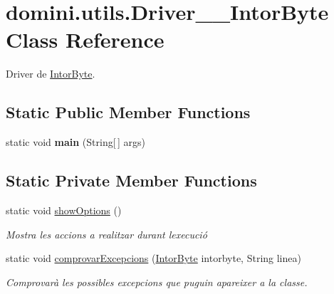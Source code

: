 \hypertarget{classdomini_1_1utils_1_1Driver____IntorByte}{}\section{domini.\+utils.\+Driver\+\_\+\+\_\+\+Intor\+Byte Class Reference}
\label{classdomini_1_1utils_1_1Driver____IntorByte}


Driver de \hyperlink{classdomini_1_1utils_1_1IntorByte}{Intor\+Byte}.  


\subsection*{Static Public Member Functions}
\begin{DoxyCompactItemize}
\item 
\mbox{\label{classdomini_1_1utils_1_1Driver____IntorByte_a82ac3bdc9baf9f3fa1b8984733d03240}} 
static void {\bfseries main} (String\mbox{[}$\,$\mbox{]} args)
\end{DoxyCompactItemize}
\subsection*{Static Private Member Functions}
\begin{DoxyCompactItemize}
\item 
\mbox{\label{classdomini_1_1utils_1_1Driver____IntorByte_a4b647dae1760fc058de9a7311595d8dd}} 
static void \hyperlink{classdomini_1_1utils_1_1Driver____IntorByte_a4b647dae1760fc058de9a7311595d8dd}{show\+Options} ()
\begin{DoxyCompactList}\small\item\em Mostra les accions a realitzar durant l\textquotesingle{}execució \end{DoxyCompactList}\item 
static void \hyperlink{classdomini_1_1utils_1_1Driver____IntorByte_a3cb28e1e1b318e0b8e4809ebd171c8b2}{comprovar\+Excepcions} (\hyperlink{classdomini_1_1utils_1_1IntorByte}{Intor\+Byte} intorbyte, String linea)
\begin{DoxyCompactList}\small\item\em Comprovarà les possibles excepcions que puguin apareixer a la classe. \end{DoxyCompactList}\end{DoxyCompactItemize}


